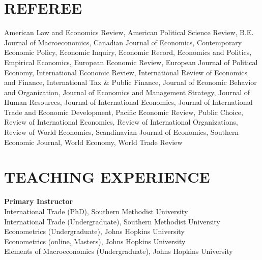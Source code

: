 \documentclass[11pt]{res}
\begin{document}
\begin{resume}
\section{REFEREE} \vspace{1.5mm}
American Law and Economics Review, American Political Science Review, B.E. Journal of Macroeconomics, Canadian Journal of Economics, Contemporary Economic Policy, Economic Inquiry, Economic Record, 
Economics and Politics, Empirical Economics, European Economic Review, European Journal of Political Economy, International Economic Review, International Review of Economics and Finance, International Tax \& Public Finance,
Journal of Economic Behavior and Organization, Journal of Economics and Management Strategy, Journal of Human Resources, Journal of International Economics, Journal of International Trade and Economic Development, Pacific Economic Review,
Public Choice, Review of International Economics, Review of International Organizations, Review of World Economics, Scandinavian Journal of Economics, Southern Economic Journal, World Economy, World Trade Review\vspace{4mm}\\

\section{TEACHING EXPERIENCE} \vspace{1.5mm}
{\bf Primary Instructor}\vspace{1.5mm}\\
International Trade (PhD), Southern Methodist University\vspace{1.5mm}\\
International Trade (Undergraduate), Southern Methodist University\vspace{1.5mm}\\
Econometrics (Undergraduate), Johns Hopkins University\vspace{1.5mm}\\
Econometrics (online, Masters), Johns Hopkins University\vspace{1.5mm}\\
Elements of Macroeconomics (Undergraduate), Johns Hopkins University

\end{resume}
\end{document}
